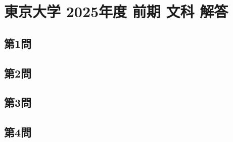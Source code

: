 ﻿\documentclass[../../uem_tok_a.tex]{subfiles}
\begin{document}
    \section{東京大学 2025年度 前期 文科 解答}

    \subsection{第1問}
    

    \clearpage

    \subsection{第2問}
    

    \clearpage

    \subsection{第3問}
    

    \clearpage

    \subsection{第4問}
    
\end{document}
